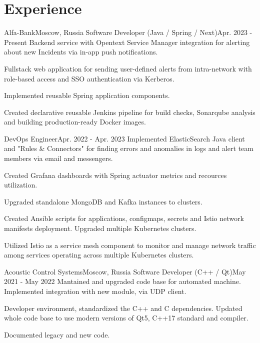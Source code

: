 

\section{Experience}\label{sec:experience}
\resumeSubHeadingListStart

\resumeSubheading
{Alfa-Bank}{Moscow, Russia}
    {Software Developer (Java / Spring / Next)}{Apr. 2023 - Present}
    \resumeItemListStart
        {Backend service with Opentext Service Manager integration for alerting about new Incidents via in-app push notifications.}

        {Fullstack web application for sending user-defined alerts from intra-network with role-based access and SSO authentication via Kerberos.}

        {Implemented reusable Spring application components.}

        {Created declarative reusable Jenkins pipeline for build checks, Sonarqube analysis and building production-ready Docker images.}
    \resumeItemListEnd

\resumeSubSubheading
{DevOps Engineer}{Apr. 2022 - Apr. 2023}
    \resumeItemListStart
        {Implemented ElasticSearch Java client and "Rules \& Connectors" for finding errors and anomalies in logs and alert team members via email and messengers.}

        {Created Grafana dashboards with Spring actuator metrics and recources utilization.}

        {Upgraded standalone MongoDB and Kafka instances to clusters.}

        {Created Ansible scripts for applications, configmaps, secrets and Istio network manifests deployment. Upgraded multiple Kubernetes clusters.}

        {Utilized Istio as a service mesh component to monitor and manage network traffic among services operating across multiple Kubernetes clusters.}
    \resumeItemListEnd

\resumeSubheading
{Acoustic Control Systems}{Moscow, Russia}
    {Software Developer (C++ / Qt)}{May 2021 - May 2022}
    \resumeItemListStart
        {Mantained and upgraded code base for automated machine. Implemented integration with new module, via UDP client.}

        {Developer environment, standardized the C++ and C dependencies. Updated whole code base to use modern versions of Qt5, C++17 standard and compiler.}

        {Documented legacy and new code.}
    \resumeItemListEnd

\resumeSubHeadingListEnd